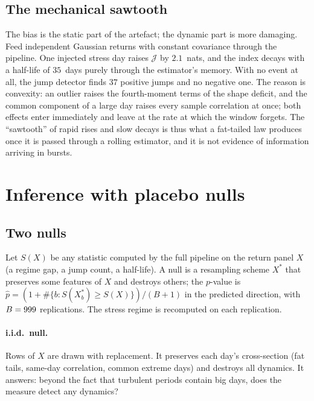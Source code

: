 \documentclass[12pt]{article}
\theoremstyle{definition}
\theoremstyle{remark}
\newcommand{\JJ}{\mathcal{J}}
\begin{document}
\begin{doublespace}
\subsection{The mechanical sawtooth}

The bias is the static part of the artefact; the dynamic part is more
damaging. Feed independent Gaussian returns with constant covariance through
the pipeline. One injected stress day raises $\JJ$ by $2.1$~nats, and the
index decays with a half-life of $35$~days purely through the estimator's
memory. With no event at all, the jump detector finds $37$ positive jumps and
no negative one. The reason is convexity: an outlier raises the fourth-moment
terms of the shape deficit, and the common component of a large day raises
every sample correlation at once; both effects enter immediately and leave at
the rate at which the window forgets. The ``sawtooth'' of rapid rises and slow
decays is thus what a fat-tailed law produces once it is passed through a
rolling estimator, and it is not evidence of information arriving in bursts.

\section{Inference with placebo nulls}
\label{sec:inference}

\subsection{Two nulls}

Let $S(X)$ be any statistic computed by the full pipeline on the return panel
$X$ (a regime gap, a jump count, a half-life). A null is a resampling scheme
$X^*$ that preserves some features of $X$ and destroys others; the $p$-value is
$\hat p=(1+\#\{b:S(X^*_b)\ge S(X)\})/(B+1)$ in the predicted direction, with
$B=999$ replications. The stress regime is recomputed on each replication.

\paragraph{i.i.d.\ null.} Rows of $X$ are drawn with replacement. It preserves
each day's cross-section (fat tails, same-day correlation, common extreme
days) and destroys all dynamics. It answers: beyond the fact that turbulent
periods contain big days, does the measure detect any dynamics?


\end{doublespace}
\end{document}
